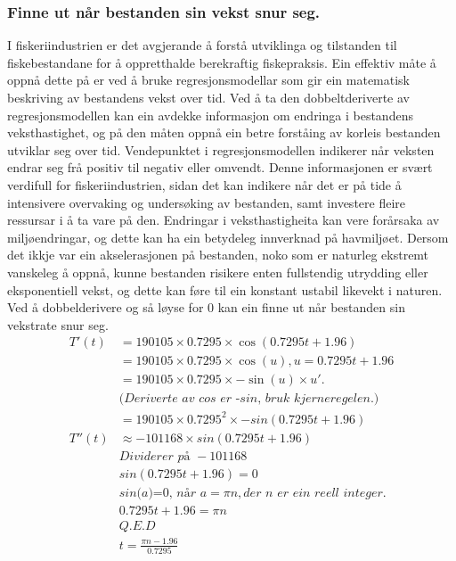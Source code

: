 \documentclass{report}
\begin{document}
\subsubsection{Finne ut når bestanden sin vekst snur seg.}
I fiskeriindustrien er det avgjerande å forstå utviklinga og tilstanden til fiskebestandane for å oppretthalde berekraftig fiskepraksis.
Ein effektiv måte å oppnå dette på er ved å bruke regresjonsmodellar som gir ein matematisk beskriving av bestandens vekst over tid.
Ved å ta den dobbeltderiverte av regresjonsmodellen kan ein avdekke informasjon om endringa i bestandens veksthastighet, og på den måten oppnå ein betre forståing av korleis bestanden utviklar seg over tid.
Vendepunktet i regresjonsmodellen indikerer når veksten endrar seg frå positiv til negativ eller omvendt.
Denne informasjonen er svært verdifull for fiskeriindustrien, sidan det kan indikere når det er på tide å intensivere overvaking og undersøking av bestanden, samt investere fleire ressursar i å ta vare på den.
Endringar i veksthastigheita kan vere forårsaka av miljøendringar, og dette kan ha ein betydeleg innverknad på havmiljøet.
Dersom det ikkje var ein akselerasjonen på bestanden, noko som er naturleg ekstremt vanskeleg å oppnå, kunne bestanden risikere enten fullstendig utrydding eller eksponentiell vekst, og dette kan føre til ein konstant ustabil likevekt i naturen.
Ved å dobbelderivere og så løyse for 0 kan ein finne ut når bestanden sin vekstrate snur seg.
\begin{align*}
	T'(t)  & = 190105 \times 0.7295 \times \cos(0.7295t+1.96)                      \\
	       & = 190105 \times 0.7295 \times \cos(u), u=0.7295t+1.96                 \\
	       & = 190105 \times 0.7295 \times -\sin(u) \times u'.                     \\
	       & \textit{(Deriverte av cos er -sin, bruk kjerneregelen.)}              \\
	       & = 190105\times 0.7295^{2}\times -sin(0.7295t+1.96)                    \\
	T''(t) & \approx -101168 \times sin(0.7295t+1.96)                              \\
	       & \textit{Dividerer på } -101168                                        \\
	       & sin(0.7295t+1.96) = 0                                                 \\
	       & \textit{sin(a)=0, når } a=\pi n, \textit{der n er ein reell integer.} \\
	       & 0.7295t+1.96 =\pi n                                                   \\
	       & Q.E.D                                                                 \\
	       & t= \frac{\pi n -1.96}{0.7295}                                         \\
\end{align*}
\end{document}
